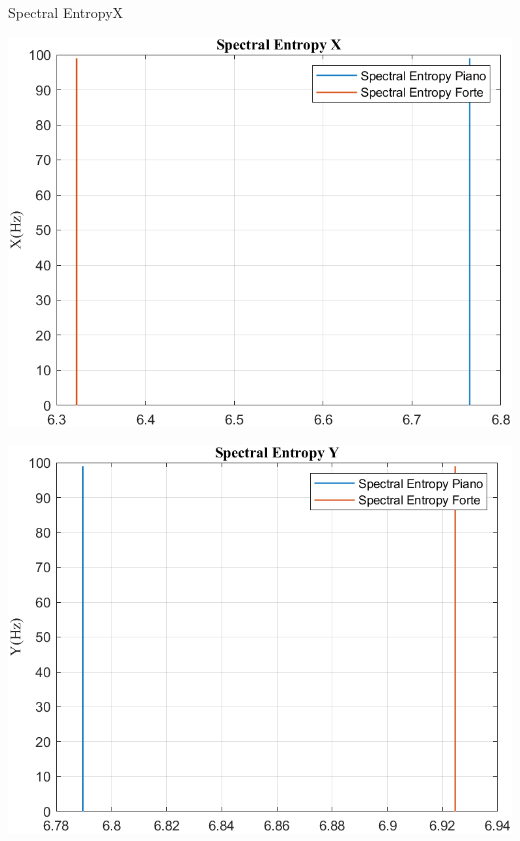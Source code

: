 	
	\begin{frame}{{Spectral EntropyX}}
		\begin{minipage}{.45\textwidth}
			\centering\includegraphics[width=.9\textwidth]{figure/Vel/Trasformata/Spectral EntropyX}
		\end{minipage}
		\hspace{.05\textwidth}
		\begin{minipage}{.45\textwidth}
			\centering\includegraphics[width=.9\textwidth]{figure/Vel/Trasformata/Spectral EntropyY}
		\end{minipage}
	\end{frame}
	
